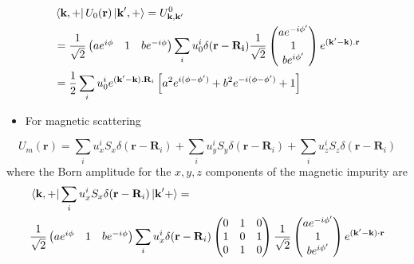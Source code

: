 \documentclass[aps,prb,amsmath,amssymb,footinbib,showpacs,twocolumn]{revtex4-2}
\begin{document}
\begin{widetext}
    \begin{align}
        &\bra{\textbf{k},+} U_{0}(\textbf{r})\ket{\textbf{k}',+} = U^{0}_{\mathbf{k,k'}}\nonumber\\
        &= \frac{1}{\sqrt{2}}\begin{pmatrix}
            ae^{i\phi} & 1 &  be^{-i\phi}
        \end{pmatrix}\sum_{i}u^{i}_{0}\delta(\mathbf{r-R_{i}})
       \frac{1}{\sqrt{2}} \begin{pmatrix}
              ae^{-i\phi'}  \\
              1 \\
               be^{i\phi'}
            \end{pmatrix}e^{(\mathbf{k'-k}).\mathbf{r}} \nonumber\\
        &=\frac{1}{2}\sum_{i}u^{i}_{0}e^{(\textbf{k}'-\textbf{k}).\textbf{R}_{i}}\left[a^{2}e^{i(\phi-\phi')}+ b^{2}e^{-i(\phi-\phi')}+1\right]
    \end{align}
    \begin{itemize}
        \item {For magnetic scattering}
    \end{itemize}
    \begin{equation}
          U_{m}(\mathbf{r})=\sum_{i}u^{i}_{x}S_{x}\delta(\textbf{r}-\textbf{R}_{i})+\sum_{i}u^{i}_{y}S_{y}\delta(\textbf{r}-\textbf{R}_{i})+\sum_{i}u^{i}_{z}S_{z}\delta(\textbf{r}-\textbf{R}_{i})
    \end{equation}
    where the Born amplitude for the $ x, y, z$ components of the magnetic impurity are
    \begin{align}
    &\bra{\textbf{k},
    +}\sum_{i}u^{i}_{x}S_{x}\delta(\textbf{r}-\textbf{R}_{i})\ket{\textbf{k}'+} = \nonumber\\  
    &\frac{1}{\sqrt{2}}\begin{pmatrix}
            ae^{i\phi} & 1 &  be^{-i\phi}
        \end{pmatrix}\sum_{i}u^{i}_{x}\delta(\textbf{r}-\textbf{R}_{i})\begin{pmatrix}
0 & 1 & 0\\
1 & 0 & 1\\
0 & 1 & 0
\end{pmatrix}
\frac{1}{\sqrt{2}}\begin{pmatrix}
              ae^{-i\phi'}  \\
              1 \\
               be^{i\phi'}
            \end{pmatrix}e^{(\mathbf{k'-k})\cdot\mathbf{r}} \nonumber\\

\end{align}
\end{widetext}
\end{document}
